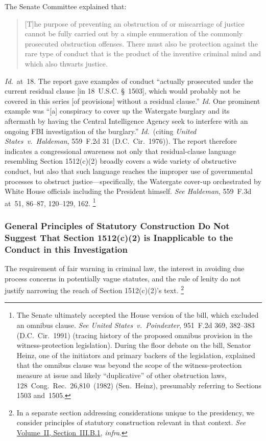 The Senate Committee explained that:

\begin{quote}
[T]he purpose of preventing an obstruction of or miscarriage of justice cannot be fully carried out by a simple enumeration of the commonly prosecuted obstruction offenses.
There must also be protection against the rare type of conduct that is the product of the inventive criminal mind and which also thwarts justice.
\end{quote}

\textit{Id.}~at~18.
The report gave examples of conduct ``actually prosecuted under the current residual clause [in 18~U.S.C. \S~1503], which would probably not be covered in this series [of provisions] without a residual clause.''
\textit{Id.}
One prominent example was ``[a] conspiracy to cover up the Watergate burglary and its aftermath by having the Central Intelligence Agency seek to interfere with an ongoing FBI investigation of the burglary.''
\textit{Id.}~(citing \textit{United States~v.\ Haldeman}, 559~F.2d 31 (D.C.~Cir.~1976)).
The report therefore indicates a congressional awareness not only that residual-clause language resembling Section 1512(c)(2) broadly covers a wide variety of obstructive conduct, but also that such language reaches the improper use of governmental processes to obstruct justice---specifically, the Watergate cover-up orchestrated by White House officials including the President himself.
\textit{See Haldeman}, 559~F.3d at~51, 86--87, 120--129, 162.%
\footnote{The Senate ultimately accepted the House version of the bill, which excluded an omnibus clause.
\textit{See United States~v.\ Poindexter}, 951~F.2d 369, 382--383 (D.C.~Cir.~1991) (tracing history of the proposed omnibus provision in the witness-protection legislation).
During the floor debate on the bill, Senator Heinz, one of the initiators and primary backers of the legislation, explained that the omnibus clause was beyond the scope of the witness-protection measure at issue and likely ``duplicative'' of other obstruction laws, 128~Cong.\ Rec.\ 26,810~(1982) (Sen.~Heinz), presumably referring to Sections 1503 and~1505.}

\subsubsection{General Principles of Statutory Construction Do Not Suggest That Section 1512(c)(2) is Inapplicable to the Conduct in this Investigation}

The requirement of fair warning in criminal law, the interest in avoiding due process concerns in potentially vague statutes, and the rule of lenity do not justify narrowing the reach of Section 1512(c)(2)'s text.%
\footnote{In a separate section addressing considerations unique to the presidency, we consider principles of statutory construction relevant in that context.
\textit{See} \hyperlink{subsubsection.2.3.2.1}{Volume~II, Section~III.B.1}, \textit{infra}.}


